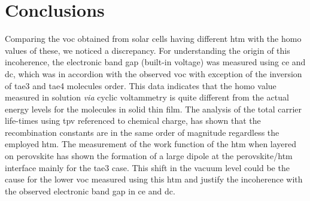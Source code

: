 	\section{Conclusions}
	Comparing the \gls{voc} obtained from solar cells having different \gls{htm} with the \gls{homo} values of these, we noticed a discrepancy.
	For understanding the origin of this incoherence, the electronic band gap (built-in voltage) was measured using \gls{ce} and \gls{dc}, which was in accordion with the observed \gls{voc} with exception of the inversion of \gls{tae3} and \gls{tae4} molecules order.
	This data indicates that the \gls{homo} value measured in solution \textsl{via} cyclic voltammetry is quite different from the actual energy levels for the molecules in solid thin film.
	The analysis of the total carrier life-times using \gls{tpv} referenced to chemical charge, has shown that the recombination constants are in the same order of magnitude regardless the employed \gls{htm}.
	The measurement of the work function of the \gls{htm} when layered on perovskite has shown the formation of a large dipole at the perovskite\-/\gls{htm} interface mainly for the \gls{tae3} case.
	This shift in the vacuum level could be the cause for the lower \gls{voc} measured using this \gls{htm} and justify the incoherence with the observed electronic band gap in \gls{ce} and \gls{dc}.
